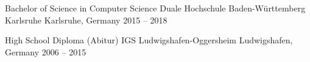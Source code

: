 \documentclass[10pt, a4paper]{cvhari}
\begin{document}
\medskip


\medskip
    \education
        {Bachelor of Science in Computer Science}
        {Duale Hochschule Baden-Württemberg Karlsruhe} 
        {Karlsruhe, Germany}
        {2015 -- 2018}
        \par
        \dividergray
     
        \education
        {High School Diploma (Abitur)}
        {IGS Ludwigshafen-Oggersheim}
        {Ludwigshafen, Germany}
        {2006 -- 2015}

        \par
        \dividergray
\end{document}
